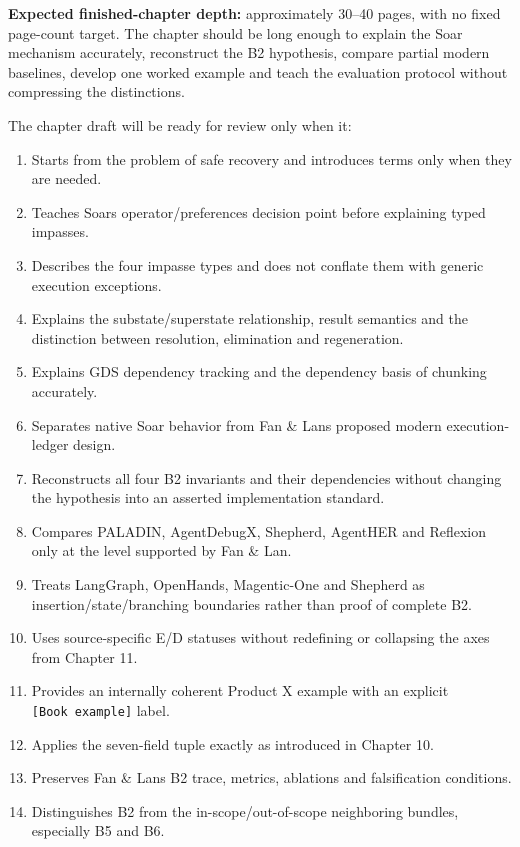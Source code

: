 \textbf{Expected finished-chapter depth:} approximately 30--40 pages, with no fixed page-count target. The chapter should be long enough to explain the Soar mechanism accurately, reconstruct the B2 hypothesis, compare partial modern baselines, develop one worked example and teach the evaluation protocol without compressing the distinctions.

The chapter draft will be ready for review only when it:

\begin{enumerate}
\def\labelenumi{\arabic{enumi}.}
\tightlist
\item
  Starts from the problem of safe recovery and introduces terms only when they are needed.
\item
  Teaches Soar\textquotesingle s operator/preferences decision point before explaining typed impasses.
\item
  Describes the four impasse types and does not conflate them with generic execution exceptions.
\item
  Explains the substate/superstate relationship, result semantics and the distinction between resolution, elimination and regeneration.
\item
  Explains GDS dependency tracking and the dependency basis of chunking accurately.
\item
  Separates native Soar behavior from Fan \& Lan\textquotesingle s proposed modern execution-ledger design.
\item
  Reconstructs all four B2 invariants and their dependencies without changing the hypothesis into an asserted implementation standard.
\item
  Compares PALADIN, AgentDebugX, Shepherd, AgentHER and Reflexion only at the level supported by Fan \& Lan.
\item
  Treats LangGraph, OpenHands, Magentic-One and Shepherd as insertion/state/branching boundaries rather than proof of complete B2.
\item
  Uses source-specific E/D statuses without redefining or collapsing the axes from Chapter 11.
\item
  Provides an internally coherent Product X example with an explicit \texttt{{[}Book\ example{]}} label.
\item
  Applies the seven-field tuple exactly as introduced in Chapter 10.
\item
  Preserves Fan \& Lan\textquotesingle s B2 trace, metrics, ablations and falsification conditions.
\item
  Distinguishes B2 from the in-scope/out-of-scope neighboring bundles, especially B5 and B6.

\end{enumerate}
